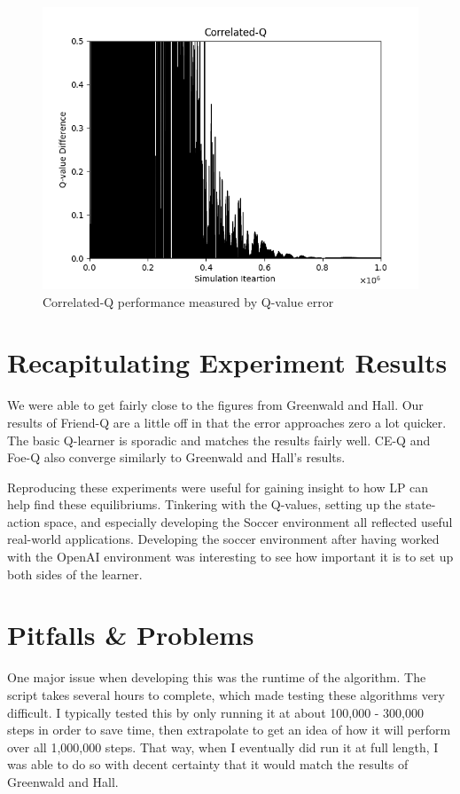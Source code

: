 \documentclass[conference]{IEEEtran}
\begin{document}
\begin{figure}[]
    \centering
    \includegraphics[scale=0.45]{figs/Correlated-Q}
    \caption{Correlated-Q performance measured by Q-value error}
    \label{fig:correlated-q}
\end{figure}

\section{Recapitulating Experiment Results}
We were able to get fairly close to the figures from Greenwald and Hall. Our results of Friend-Q are a little off in that the error approaches zero a lot quicker. The basic Q-learner is sporadic and matches the results fairly well. CE-Q and Foe-Q also converge similarly to Greenwald and Hall's results.

Reproducing these experiments were useful for gaining insight to how LP can help find these equilibriums. Tinkering with the Q-values, setting up the state-action space, and especially developing the Soccer environment all reflected useful real-world applications. Developing the soccer environment after having worked with the OpenAI environment was interesting to see how important it is to set up both sides of the learner.

\section{Pitfalls \& Problems}
One major issue when developing this was the runtime of the algorithm. The script takes several hours to complete, which made testing these algorithms very difficult. I typically tested this by only running it at about 100,000 - 300,000 steps in order to save time, then extrapolate to get an idea of how it will perform over all 1,000,000 steps. That way, when I eventually did run it at full length, I was able to do so with decent certainty that it would match the results of Greenwald and Hall.
\end{document}

